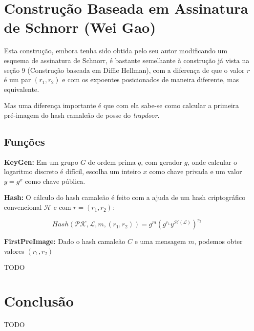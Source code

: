 \documentclass[a4paper]{article}
\begin{document}
\section{Construção Baseada em Assinatura de Schnorr (Wei Gao) \cite{wei}}

Esta construção, embora tenha sido obtida pelo seu autor modificando
um esquema de assinatura de Schnorr, é bastante semelhante à
construção já vista na seção 9 (Construção baseada em Diffie Hellman),
com a diferença de que o valor $r$ é um par $(r_1, r_2)$ e com os
expoentes posicionados de maneira diferente, mas equivalente.

Mas uma diferença importante é que com ela sabe-se como calcular a
primeira pré-imagem do hash camaleão de posse do \textit{trapdoor}.

\subsection{Funções}

\textbf{KeyGen: } Em um grupo $G$ de ordem prima $q$, com gerador
$g$, onde calcular o logaritmo discreto é difícil, escolha um inteiro
$x$ como chave privada e um valor $y=g^x$ como chave pública.

\textbf{Hash: } O cálculo do hash camaleão é feito com a ajuda de um
hash criptográfico convencional $\mathcal{H}$ e com $r=(r_1, r_2)$:

$$
Hash(\mathcal{PK}, \mathcal{L}, m, (r_1, r_2)) =
g^m(g^{r_1}y^{\mathcal{H}(\mathcal{L})})^{r_2}
$$

\textbf{FirstPreImage:} Dado o hash camaleão $C$ e uma mensagem $m$,
podemos obter valores $(r_1, r_2)$

TODO

\section{Conclusão}

TODO

{}
\end{document}
